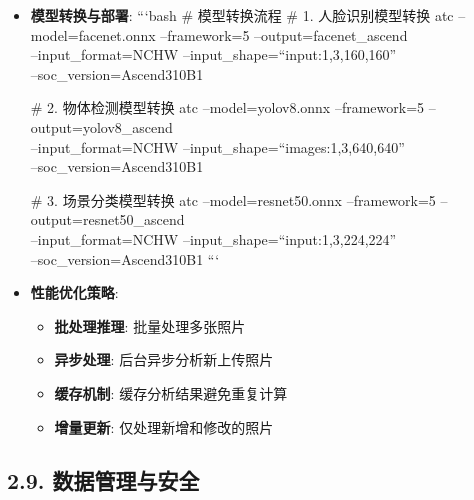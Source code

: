 \begin{itemize}
\item
  \textbf{模型转换与部署}: ```bash \# 模型转换流程 \# 1.
  人脸识别模型转换 atc --model=facenet.onnx --framework=5
  --output=facenet\_ascend\\
  --input\_format=NCHW --input\_shape=``input:1,3,160,160''\\
  --soc\_version=Ascend310B1

  \# 2. 物体检测模型转换 atc --model=yolov8.onnx --framework=5
  --output=yolov8\_ascend\\
  --input\_format=NCHW --input\_shape=``images:1,3,640,640''\\
  --soc\_version=Ascend310B1

  \# 3. 场景分类模型转换 atc --model=resnet50.onnx --framework=5
  --output=resnet50\_ascend\\
  --input\_format=NCHW --input\_shape=``input:1,3,224,224''\\
  --soc\_version=Ascend310B1 ```
\item
  \textbf{性能优化策略}:

  \begin{itemize}
  \tightlist
  \item
    \textbf{批处理推理}: 批量处理多张照片
  \item
    \textbf{异步处理}: 后台异步分析新上传照片
  \item
    \textbf{缓存机制}: 缓存分析结果避免重复计算
  \item
    \textbf{增量更新}: 仅处理新增和修改的照片
  \end{itemize}
\end{itemize}

\subsection{2.9.
数据管理与安全}\label{ux6570ux636eux7ba1ux7406ux4e0eux5b89ux5168}

